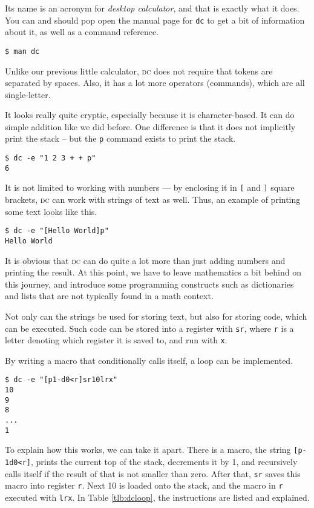 \documentclass[a4paper,twocolumn]{article}
\begin{document}
 Its name is an acronym for \emph{desktop calculator}, and that is exactly what it does. You can and should pop open the manual page for \verb|dc| to get a bit of information about it, as well as a command reference.

\begin{verbatim}
$ man dc
\end{verbatim}

Unlike our previous little calculator, \textsc{dc} does not require that tokens are separated by spaces. Also, it has a lot more operators (commands), which are all single-letter. 

It looks really quite cryptic, especially because it is character-based. It can do simple addition like we did before. One difference is that it does not implicitly print the stack -- but the \verb|p| command exists to print the stack.

\begin{verbatim}
$ dc -e "1 2 3 + + p"
6
\end{verbatim}

It is not limited to working with numbers — by enclosing it in \verb|[| and \verb|]| square brackets, \textsc{dc} can work with strings of text as well. Thus, an example of printing some text looks like this.

\begin{verbatim}
$ dc -e "[Hello World]p"
Hello World  
\end{verbatim}

It is obvious that \textsc{dc} can do quite a lot more than just adding numbers and printing the result. At this point, we have to leave mathematics a bit behind on this journey, and introduce some programming constructs such as dictionaries and lists that are not typically found in a math context.

Not only can the strings be used for storing text, but also for storing code, which can be executed. Such code can be stored into a register with \verb|sr|, where \verb|r| is a letter denoting which register it is saved to, and run with \verb|x|.

By writing a macro that conditionally calls itself, a loop can be implemented.

\begin{verbatim}
$ dc -e "[p1-d0<r]sr10lrx"
10
9
8
...
1
\end{verbatim}

To explain how this works, we can take it apart. There is a macro, the string \verb|[p-1d0<r]|, prints the current top of the stack, decrements it by 1, and recursively calls itself if the result of that is not smaller than zero. After that, \verb|sr| saves this macro into register \verb|r|. Next 10 is loaded onto the stack, and the macro in \verb|r| executed with \verb|lrx|. In Table \ref{tlb:dcloop}, the instructions are listed and explained.
\end{document}
